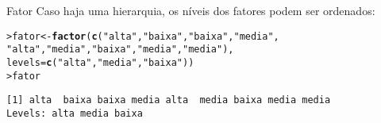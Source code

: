 \documentclass[10pt,handout]{beamer}\usepackage{graphicx, color}
\makeatletter
\newcommand{\hlfunctioncall}[1]{\textcolor[rgb]{0,0,0.545098039215686}{\textbf{#1}}}%
\newcommand{\hlstring}[1]{\textcolor[rgb]{0.282352941176471,0.23921568627451,0.545098039215686}{#1}}%
\newenvironment{kframe}{%
 \def\at@end@of@kframe{}%
 \ifinner\ifhmode%
  \def\at@end@of@kframe{\end{minipage}}%
  \begin{minipage}{\columnwidth}%
 \fi\fi%
 \def\FrameCommand##1{\hskip\@totalleftmargin \hskip-\fboxsep
 \colorbox{shadecolor}{##1}\hskip-\fboxsep
     \hskip-\linewidth \hskip-\@totalleftmargin \hskip\columnwidth}%
 \MakeFramed {\advance\hsize-\width
   \@totalleftmargin\z@ \linewidth\hsize
   \@setminipage}}%
 {\par\unskip\endMakeFramed%
 \at@end@of@kframe}
\newenvironment{knitrout}{}{} %
\makeatother
\begin{document}
\begin{frame}[fragile=singleslide]{Fator}
Caso haja uma hierarquia, os níveis dos fatores podem ser ordenados:
\begin{knitrout}\small
{}\color{fgcolor}\begin{kframe}
\begin{alltt}
> fator <- \hlfunctioncall{factor}(\hlfunctioncall{c}(\hlstring{"alta"},\hlstring{"baixa"},\hlstring{"baixa"},\hlstring{"media"},
                    \hlstring{"alta"},\hlstring{"media"},\hlstring{"baixa"},\hlstring{"media"},\hlstring{"media"}),
                  levels=\hlfunctioncall{c}(\hlstring{"alta"},\hlstring{"media"},\hlstring{"baixa"}))
> fator
\end{alltt}
\begin{verbatim}
[1] alta  baixa baixa media alta  media baixa media media
Levels: alta media baixa
\end{verbatim}
\end{kframe}
\end{knitrout}

\end{frame}
\end{document}
